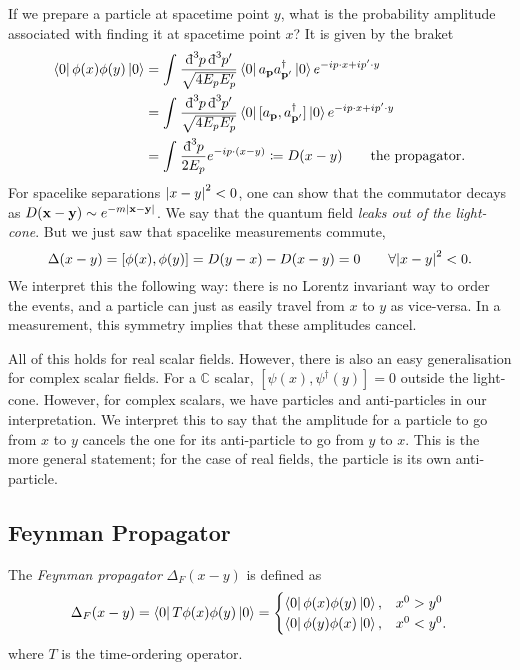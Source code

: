 If we prepare a particle at spacetime point $y$, what is the probability amplitude associated with finding it at spacetime point $x$?
It is given by the braket
\begin{align}
  \bra{0} \phi(x) \phi(y) \ket{0} &= \int_{}^{} \frac{\bdd[3]{p} \bdd[3]{p'}}{\sqrt{4 E_p E_p'}} \bra{0} a_{\vb{p}} a^{\dagger}_{\vb{p}'} \ket{ 0} e^{-ip \cdot x + i p' \cdot y} \\
				  &= \int_{}^{} \frac{\bdd[3]{p} \bdd[3]{p'}}{\sqrt{4 E_p E_p'}} \bra{0} [a_{\vb{p}}, a^{\dagger}_{\vb{p}'}] \ket{ 0} e^{-ip \cdot x + i p' \cdot y} \\
				  &= \int_{}^{} \frac{\bdd[3]{p}}{2 E_p} e^{-ip \cdot (x - y)} \coloneqq D(x - y) \qquad \text{the propagator}.
\end{align}
For spacelike separations $\abs{x - y}^2 < 0$, one can show that the commutator decays as $D(\vb{x} - \vb{y}) \sim e^{-m \abs{\vb{x} - \vb{y}}}$. We say that the quantum field \emph{leaks out of the light-cone}.
But we just saw that spacelike measurements commute,
\begin{equation}
  \Delta(x - y) = [\phi(x), \phi(y)] = D(y- x)-D(x-y) = 0 \qquad \forall \abs{x - y}^2 < 0.
\end{equation}
We interpret this the following way: there is no Lorentz invariant way to order the events, and a particle can just as easily travel from $x$ to $y$ as vice-versa. In a measurement, this symmetry implies that these amplitudes cancel.

All of this holds for real scalar fields. However, there is also an easy generalisation for complex scalar fields.
For a $\mathbb{C}$ scalar, $[\psi(x), \psi^{\dagger}(y)] = 0$ outside the light-cone.
However, for complex scalars, we have particles and anti-particles in our interpretation. We interpret this to say that the amplitude for a particle to go from $x$ to $y$ cancels the one for its anti-particle to go from $y$ to $x$. 
This is the more general statement; for the case of real fields, the particle is its own anti-particle.

\subsection{Feynman Propagator}%
\label{sub:feynman_propagator}

\begin{definition}
  The \emph{Feynman propagator} $\Delta_F(x - y)$ is defined as
  \begin{equation}
    \Delta_F (x - y) = \bra{0} T \phi(x) \phi(y) \ket{0}= 
    \begin{cases}
      \bra{0} \phi(x) \phi(y) \ket{0}, & x^0 > y^0 \\
      \bra{0} \phi(y) \phi(x) \ket{0}, & x^0 < y^0.
    \end{cases}
  \end{equation}
  where $T$ is the time-ordering operator.
\end{definition}

